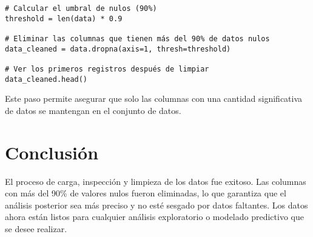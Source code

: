 \documentclass[12pt]{article}
\begin{document}
\begin{verbatim}
# Calcular el umbral de nulos (90%)
threshold = len(data) * 0.9

# Eliminar las columnas que tienen más del 90% de datos nulos
data_cleaned = data.dropna(axis=1, thresh=threshold)

# Ver los primeros registros después de limpiar
data_cleaned.head()
\end{verbatim}

Este paso permite asegurar que solo las columnas con una cantidad significativa de datos se mantengan en el conjunto de datos.

\section{Conclusión}
El proceso de carga, inspección y limpieza de los datos fue exitoso. Las columnas con más del 90\% de valores nulos fueron eliminadas, lo que garantiza que el análisis posterior sea más preciso y no esté sesgado por datos faltantes. Los datos ahora están listos para cualquier análisis exploratorio o modelado predictivo que se desee realizar.
\end{document}
